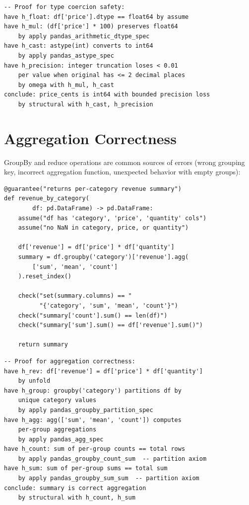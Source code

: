\documentclass[11pt,a4paper]{report}
\theoremstyle{definition}
\theoremstyle{plain}
\begin{document}
\begin{lstlisting}[style=proof]
-- Proof for type coercion safety:
have h_float: df['price'].dtype == float64 by assume
have h_mul: (df['price'] * 100) preserves float64
    by apply pandas_arithmetic_dtype_spec
have h_cast: astype(int) converts to int64
    by apply pandas_astype_spec
have h_precision: integer truncation loses < 0.01
    per value when original has <= 2 decimal places
    by omega with h_mul, h_cast
conclude: price_cents is int64 with bounded precision loss
    by structural with h_cast, h_precision
\end{lstlisting}

\section{Aggregation Correctness}

GroupBy and reduce operations are common sources of errors (wrong grouping
key, incorrect aggregation function, unexpected behavior with empty groups):

\begin{lstlisting}[style=synhopy]
@guarantee("returns per-category revenue summary")
def revenue_by_category(
        df: pd.DataFrame) -> pd.DataFrame:
    assume("df has 'category', 'price', 'quantity' cols")
    assume("no NaN in category, price, or quantity")

    df['revenue'] = df['price'] * df['quantity']
    summary = df.groupby('category')['revenue'].agg(
        ['sum', 'mean', 'count']
    ).reset_index()

    check("set(summary.columns) == "
          "{'category', 'sum', 'mean', 'count'}")
    check("summary['count'].sum() == len(df)")
    check("summary['sum'].sum() == df['revenue'].sum()")

    return summary
\end{lstlisting}

\begin{lstlisting}[style=proof]
-- Proof for aggregation correctness:
have h_rev: df['revenue'] = df['price'] * df['quantity']
    by unfold
have h_group: groupby('category') partitions df by
    unique category values
    by apply pandas_groupby_partition_spec
have h_agg: agg(['sum', 'mean', 'count']) computes
    per-group aggregations
    by apply pandas_agg_spec
have h_count: sum of per-group counts == total rows
    by apply pandas_groupby_count_sum  -- partition axiom
have h_sum: sum of per-group sums == total sum
    by apply pandas_groupby_sum_sum  -- partition axiom
conclude: summary is correct aggregation
    by structural with h_count, h_sum
\end{lstlisting}
\end{document}
